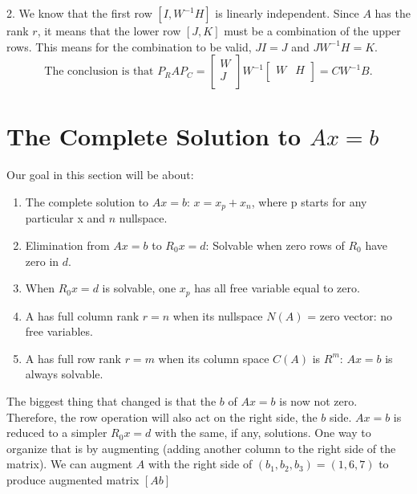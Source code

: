 2. We know that the first row \([I, W^{-1}H]\) is linearly independent. Since \(A\) has the rank \(r\), it means that the lower row \([J, K]\) must be a combination of the upper rows. This means for the combination to be valid, \(JI = J\) and \(JW^{-1}H = K\). 
\[
    \text{The conclusion is that }
    P_{R}AP_{C} = 
    \begin{bmatrix}
         W \\
         J \\
    \end{bmatrix}
    W^{-1}
    \begin{bmatrix}
        W & H  \\
    \end{bmatrix}
    = CW^{-1}B.
\] 

\section{The Complete Solution to \(Ax = b\)}

Our goal in this section will be about: 
\begin{enumerate}
    \item The complete solution to \(Ax = b\): \(x = x_p + x_n\), where p starts for any particular x and \(n\) nullspace. 
    \item Elimination from \(Ax = b\) to \(R_{0}x = d\): Solvable when zero rows of \(R_0\) have zero in \(d\).   
    \item When \(R_{0}x = d\) is solvable, one \(x_p\) has all free variable equal to zero. 
    \item A has full column rank \(r = n\) when its nullspace \(N(A)\) = zero vector: no free variables. 
    \item A has full row rank \(r = m\) when its column space \(C(A)\) is \(R^m\): \(Ax = b\) is always solvable.         
\end{enumerate}

The biggest thing that changed is that the \(b\) of \(Ax = b\) is now not zero. Therefore, the row operation will also act on the right side, the \(b\) side. \(Ax = b\) is reduced to a simpler \(R_{0}x = d\) with the same, if any, solutions. One way to organize that is by augmenting (adding another column to the right side of the matrix). We can augment \(A\) with the right side of \((b_1, b_2, b_3) = (1, 6, 7)\) to produce augmented matrix \([A b]\)         

